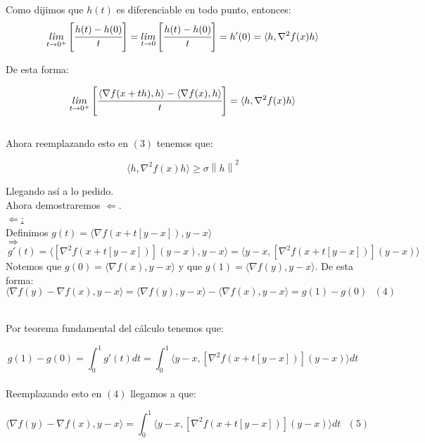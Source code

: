 \documentclass[11pt]{article}
\begin{document}
Como dijimos que $ h(t) $ es diferenciable en todo punto, entonces: \\

\[ \underset {t \to 0^+} {l \acute{\imath}m} \left[ \cfrac{h(t) - h(0)}{t}  \right] = \underset {t \to 0} {l \acute{\imath}m} \left[ \cfrac{h(t) - h(0)}{t}  \right] = h'(0) = \langle h, \nabla^2 f(x) h \rangle  \]

De esta forma:

\[ \underset {t \to 0^+} {l \acute{\imath}m} \left[ \cfrac{\langle \nabla f(x+th) ,h \rangle - \langle \nabla f(x) ,h \rangle}{t}  \right] = \langle h, \nabla^2 f(x) h \rangle \] \\

Ahora reemplazando esto en $(3)$ tenemos que:

\[  \langle h, \nabla^2 f(x) h \rangle \geq \sigma \left\| h \right\|^{2}  \]

Llegando así a lo pedido. \\

Ahora demostraremos $ \Leftarrow $.\\

\underline{$\Leftarrow$:} \\

Definimos $ g(t) = \langle \nabla f(x+t[y-x]),y-x \rangle $ \\

$ \Rightarrow $ \\

$ \ g'(t) = \langle [\nabla^2 f(x+t[y-x])](y-x),y-x \rangle = \langle y-x, [\nabla^2 f(x+t[y-x])](y-x) \rangle $ \\

Notemos que $ g(0) = \langle \nabla f(x),y-x \rangle $ y que $ g(1) = \langle \nabla f(y),y-x \rangle $. De esta forma: \\

\[ \langle \nabla f(y) - \nabla f(x),y-x \rangle  = \langle \nabla f(y),y-x \rangle - \langle \nabla f(x),y-x \rangle = g(1) - g(0) \ \ \ (4) \] \

Por teorema fundamental del cálculo tenemos que: \

\[ g(1) - g(0) = \int_{0}^{1} g'(t) dt = \int_{0}^{1} \langle y-x, [\nabla^2 f(x+t[y-x])](y-x) \rangle dt \] \\

Reemplazando esto en $(4)$ llegamos a que: 

\[ \langle \nabla f(y) - \nabla f(x),y-x \rangle = \int_{0}^{1} \langle y-x, [\nabla^2 f(x+t[y-x])](y-x) \rangle dt \ \ \ (5) \] \
\end{document}

